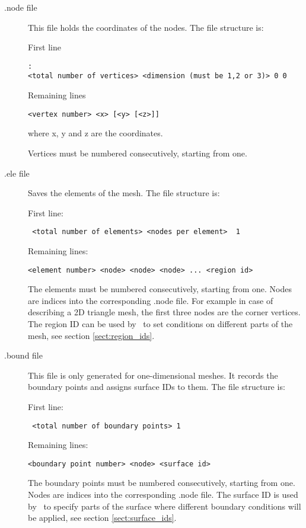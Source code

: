 \begin{description}
\item[.node file]
This file holds the coordinates of the nodes. The file structure is:

First line
\begin{lstlisting}: 
<total number of vertices> <dimension (must be 1,2 or 3)> 0 0
\end{lstlisting}
Remaining lines
\begin{lstlisting}
<vertex number> <x> [<y> [<z>]]
\end{lstlisting} 
where x, y and z are the coordinates.

Vertices must be numbered consecutively, starting from one. 

\item[.ele file] Saves the elements of the mesh. The file structure is:

First line:
\begin{lstlisting}
 <total number of elements> <nodes per element>  1
\end{lstlisting}
Remaining lines:
\begin{lstlisting} 
<element number> <node> <node> <node> ... <region id>
\end{lstlisting}  
The elements must be numbered consecutively, starting from one. Nodes are
indices into the corresponding .node file. For example in case of describing
a 2D triangle mesh, the first three nodes are the corner vertices. The
region ID can be used by \fluidity\ to set conditions on different parts of
the mesh, see section \ref{sect:region_ids}.

\item[.bound file] This file is only generated for one-dimensional meshes.
  It records the boundary points and assigns surface IDs to them. The file
  structure is:

First line:
\begin{lstlisting}
 <total number of boundary points> 1
\end{lstlisting}
Remaining lines:
\begin{lstlisting} 
<boundary point number> <node> <surface id>
\end{lstlisting}  
The boundary points must be numbered consecutively, starting from one. Nodes
are indices into the corresponding .node file. The surface ID is used by
\fluidity\ to specify parts of the surface where different boundary
conditions will be applied, see section \ref{sect:surface_ids}.


\end{description}
